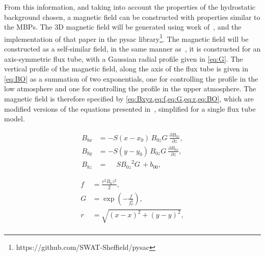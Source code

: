 \documentclass[a4paper,12pt,fourier,authoryear,custommargin]{Classes/PhDThesisPSnPDF}
\begin{document}
\newcommand{\BO}{{B_{0z}}}
\newcommand{\GO}{{G}}
\newcommand{\bc}{{b_{00}}}
\newcommand{\bF}{{b_{01}}}
\newcommand{\za}{{z_{1}}}
\newcommand{\bb}{{b_{02}}}
\newcommand{\zb}{{z_{2}}}

From this information, and taking into account the properties of the hydrostatic background chosen, a magnetic field can be constructed with properties similar to the MBPs.
The 3D magnetic field will be generated using work of~\cite{gent2013, gent2014}, and the implementation of that paper in the pysac library\footnote{https://github.com/SWAT-Sheffield/pysac}.
The magnetic field will be constructed as a self-similar field, in the same manner as~\cite{schluter1958}, it is constructed for an axis-symmetric flux tube, with a Gaussian radial profile given in \cref{eq:G}.
The vertical profile of the magnetic field, along the axis of the flux tube is given in \cref{eq:BO} as a summation of two exponentials, one for controlling the profile in the low atmosphere and one for controlling the profile in the upper atmosphere.
The magnetic field is therefore specified by \cref{eq:Bxyz,eq:f,eq:G,eq:r,eq:BO}, which are modified versions of the equations presented in~\cite{gent2014}, simplified for a single flux tube model.

\begin{equation}\label{eq:Bxyz}
\begin{aligned}
B_{bx} &= -S(x-x_0) {\, \BO\GO \:} \frac{\partial \BO}{\partial z},
\\
B_{by} &= -S(y-y_0) {\, \BO\GO \:} \frac{\partial \BO}{\partial z},
\\
B_{bz} &= \phantom{-}S{\BO^2\GO  \,} + \bc,
\end{aligned}
\end{equation}


\begin{align}
f &= \frac{r^2 B_0z^2}{2},  \label{eq:f}
\\
G &= \exp\left(-\frac{f}{f_0^2}\right),  \label{eq:G}
\\
r \,   &= \sqrt{(x-x )^2+(y-y )^2},\\  \label{eq:r}
\end{align}
\end{document}
